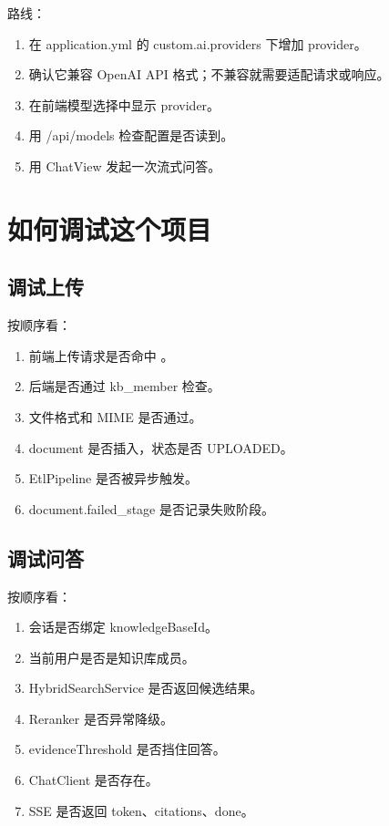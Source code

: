 \documentclass[UTF8,zihao=-4]{ctexart}
\begin{document}
路线：

\begin{enumerate}
  \item 在 application.yml 的 custom.ai.providers 下增加 provider。
  \item 确认它兼容 OpenAI API 格式；不兼容就需要适配请求或响应。
  \item 在前端模型选择中显示 provider。
  \item 用 /api/models 检查配置是否读到。
  \item 用 ChatView 发起一次流式问答。
\end{enumerate}

\section{如何调试这个项目}

\subsection{调试上传}

按顺序看：

\begin{enumerate}
  \item 前端上传请求是否命中 。
  \item 后端是否通过 kb\_member 检查。
  \item 文件格式和 MIME 是否通过。
  \item document 是否插入，状态是否 UPLOADED。
  \item EtlPipeline 是否被异步触发。
  \item document.failed\_stage 是否记录失败阶段。
\end{enumerate}

\subsection{调试问答}

按顺序看：

\begin{enumerate}
  \item 会话是否绑定 knowledgeBaseId。
  \item 当前用户是否是知识库成员。
  \item HybridSearchService 是否返回候选结果。
  \item Reranker 是否异常降级。
  \item evidenceThreshold 是否挡住回答。
  \item ChatClient 是否存在。
  \item SSE 是否返回 token、citations、done。
\end{enumerate}
\end{document}
